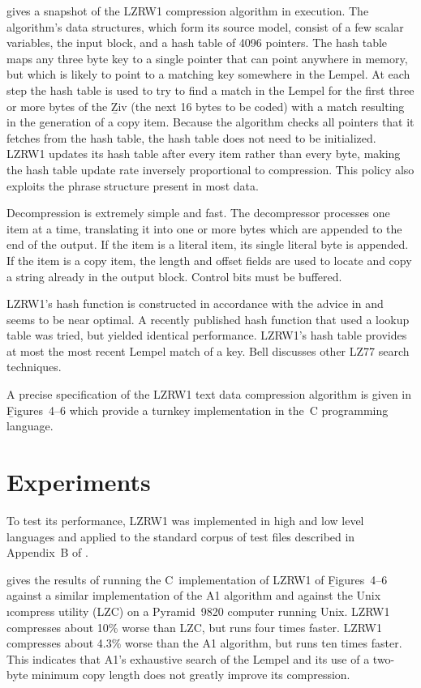  gives a snapshot of  the LZRW1 compression algorithm in
execution.  The algorithm's  data  structures, which  form its  source
model, consist of a few scalar  variables, the input block, and a hash
table of  4096 pointers. The hash  table maps any three  byte key to a
single pointer that can point anywhere  in memory, but which is likely
to point to a  matching key somewhere in the Lempel.  At each step the
hash table is used to try to find  a match in the Lempel for the first
three or  more bytes of  the \b{Ziv} (the next  16 bytes to  be coded)
with a match  resulting in the generation of a  copy item. Because the
algorithm checks all pointers that it fetches from the hash table, the
hash table  does not need  to be  initialized. LZRW1 updates  its hash
table after every  item rather than every byte, making  the hash table
update rate  inversely proportional  to compression. This  policy also
exploits the phrase structure present in most data.

Decompression is extremely simple and fast. The decompressor processes
one item at  a time, translating it  into one or more  bytes which are
appended to the end of the output.  If the item is a literal item, its
single  literal byte  is appended.  If the  item is  a copy  item, the
length and offset fields are used  to locate and copy a string already
in the output block. Control bits must be buffered.

LZRW1's hash function is constructed  in accordance with the advice in
 and  seems to  be near  optimal. A  recently published
hash function that used a lookup table was tried, but
yielded identical performance. LZRW1's hash table provides at most the
most recent Lempel match of a key. Bell discusses other
LZ77 search techniques.

A precise specification  of the LZRW1 text  data compression algorithm
is given in \b{Figures~4--6} which provide a turnkey implementation in
the~C programming language.

\section{Experiments}

To test its  performance, LZRW1 was implemented in high  and low level
languages and applied  to the standard corpus of  test files described
in Appendix~B of .

 gives  the results  of running the  C~implementation of
LZRW1 of \b{Figures~4--6}  against a similar implementation  of the A1
algorithm  and  against  the  Unix  \i{compress}  utility  (LZC)  on a
Pyramid~9820 computer running Unix.  LZRW1 compresses about 10\% worse
than LZC,  but runs  four times faster.  LZRW1 compresses  about 4.3\%
worse than the A1 algorithm, but runs ten times faster. This indicates
that A1's  exhaustive search of the  Lempel and its use  of a two-byte
minimum copy length does not greatly improve its compression.

